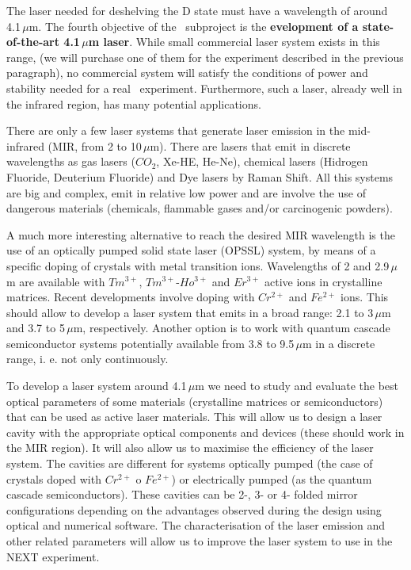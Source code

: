 The laser needed for deshelving the D state must have a wavelength of around 4.1\,$\mu$m. The fourth objective of the \BATA\ subproject is the {\bf evelopment of a state-of-the-art 4.1\,$\mu$m laser}. While small commercial laser system exists in this range, (we will purchase one of them for the experiment described in the previous paragraph), no commercial system will satisfy the conditions of power and stability needed for a real \BATA\ experiment. Furthermore, such a laser, already well in the infrared region, has many potential applications.	

There are only a few laser systems that generate laser emission in the mid-infrared (MIR, from 2 to 10\,$\mu$m). There are lasers that emit in discrete wavelengths as gas lasers ($CO_2$, Xe-HE, He-Ne), chemical lasers (Hidrogen Fluoride, Deuterium Fluoride) and Dye lasers by Raman Shift. All this systems are big and complex, emit in relative low power and are involve the use of dangerous materials (chemicals, flammable gases and/or carcinogenic powders). 

A much more interesting alternative to reach the desired MIR wavelength is the use of an optically pumped solid state laser (OPSSL) system, by means of a specific doping of crystals with metal transition ions. Wavelengths of 2 and 2.9\,$\mu$m are available with $Tm^{3+}$, $Tm^{3+}$-$Ho^{3+}$ and $Er^{3+}$ active ions in crystalline matrices. Recent developments involve doping with $Cr^{2+}$ and $Fe^{2+}$ ions. This should allow to develop a laser system that emits in a broad range: 2.1 to 3\,$\mu$m and 3.7 to 5\,$\mu$m, respectively. Another option is to work with quantum cascade semiconductor systems potentially available from 3.8 to 9.5\,$\mu$m in a discrete range, i. e.  not only continuously. 

To develop a laser system around 4.1\,$\mu$m we need to study and evaluate the best optical parameters of some materials (crystalline matrices or semiconductors) that can be used as active laser materials.  This will allow us to design a laser cavity with the appropriate  optical components and devices (these should work in the MIR region). It will also allow us to maximise the efficiency of the laser system. The cavities are different for systems optically pumped (the case of crystals doped with $Cr^{2+}$ o $Fe^{2+}$) or electrically pumped (as the quantum cascade semiconductors). These cavities can be 2-, 3- or 4- folded mirror configurations depending on the advantages observed during the design using optical and numerical software. The characterisation of the laser emission and other related parameters will allow us  to improve the laser system to use in the NEXT experiment. 